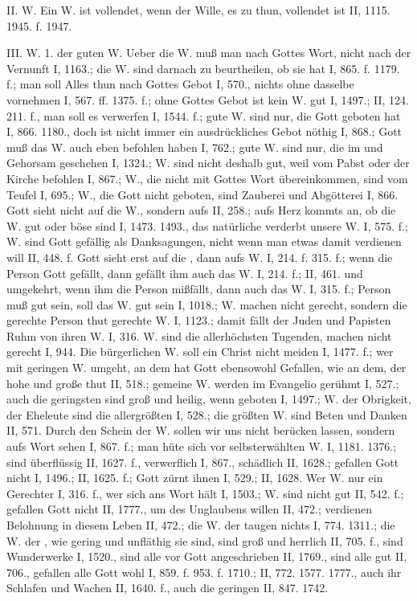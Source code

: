 II. W.  Ein W. ist vollendet, wenn der Wille, es zu thun, vollendet ist II, 1115. 1945. f. 1947.

III.  W. 1.  der guten W. Ueber die W. muß man nach Gottes Wort, nicht nach der Vernunft  I, 1163.; die W. sind darnach zu beurtheilen, ob sie  hat I, 865. f. 1179. f.; man soll Alles thun nach Gottes Gebot I, 570., nichts ohne dasselbe vornehmen I, 567. ff. 1375. f.; ohne Gottes Gebot ist kein W. gut I, 1497.; II, 124. 211. f., man soll es verwerfen I, 1544. f.; gute W. sind nur, die Gott geboten hat I, 866. 1180., doch ist nicht immer ein ausdrückliches Gebot nöthig I, 868.; Gott muß das W. auch eben  befohlen haben I, 762.; gute W. sind nur, die im  und Gehorsam geschehen I, 1324.; W. sind nicht deshalb gut, weil vom Pabst oder der Kirche befohlen I, 867.; W., die nicht mit Gottes Wort übereinkommen, sind vom Teufel I, 695.; W., die Gott nicht geboten, sind Zauberei und Abgötterei I, 866. Gott sieht nicht auf die W., sondern aufs  II, 258.; aufs Herz kommts an, ob die W. gut oder böse sind I, 1473. 1493., das natürliche verderbt unsere W. I, 575. f.; W. sind Gott gefällig als Danksagungen, nicht wenn man etwas damit verdienen will II, 448. f. Gott sieht erst auf die , dann aufs W. I, 214. f. 315. f.; wenn die Person Gott gefällt, dann gefällt ihm auch das W. I, 214. f.; II, 461. und umgekehrt, wenn ihm die Person mißfällt, dann auch das W. I, 315. f.; Person muß gut sein, soll das W. gut sein I, 1018.; W. machen nicht gerecht, sondern die gerechte Person thut gerechte W. I, 1123.; damit fällt der Juden und Papisten Ruhm von ihren W. I, 316. W.  sind die allerhöchsten Tugenden, machen nicht gerecht I, 944. Die  bürgerlichen W. soll ein Christ nicht meiden I, 1477. f.; wer mit geringen W. umgeht, an dem hat Gott ebensowohl Gefallen, wie an dem, der hohe und große thut II, 518.; gemeine W. werden im Evangelio gerühmt I, 527.; auch die geringsten sind groß und heilig, wenn geboten I, 1497.; W. der Obrigkeit, der Eheleute sind die allergrößten I, 528.; die größten W. sind Beten und Danken II, 571. Durch den Schein der  W. sollen wir uns nicht berücken lassen, sondern aufs Wort sehen I, 867. f.; man hüte sich vor selbsterwählten W. I, 1181. 1376.; sind überflüssig II, 1627. f., verwerflich I, 867., schädlich II, 1628.; gefallen Gott nicht I, 1496.; II, 1625. f.; Gott zürnt ihnen I, 529.; II, 1628. Wer  W.  nur ein Gerechter I, 316. f., wer sich ans Wort hält I, 1503.; W.  sind nicht gut II, 542. f.; gefallen Gott nicht II, 1777., um des Unglaubens willen II, 472.; verdienen Belohnung in diesem Leben II, 472.; die W. der  taugen nichts I, 774. 1311.; die W. der , wie gering und unfläthig sie sind, sind groß und herrlich II, 705. f., sind Wunderwerke I, 1520., sind alle vor Gott angeschrieben II, 1769., sind alle gut II, 706., gefallen alle Gott wohl I, 859. f. 953. f. 1710.; II, 772. 1577. 1777., auch ihr Schlafen und Wachen II, 1640. f., auch die geringen II, 847. 1742. 
